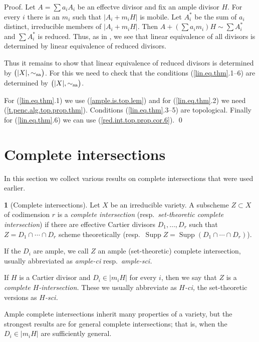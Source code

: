 \documentclass{amsart}
\theoremstyle{definition}
\newtheorem{say}[thm]{}
\theoremstyle{remark}
\newcommand{\supp}[0]{\operatorname{Supp}}
\newcommand{\tsum}[0]{\textstyle{\sum}}
\newcommand{\simsa}[0]{\sim_{\rm sa}}
\begin{document}
Proof. Let $A=\sum a_iA_i$ be an effectve divisor and fix an ample divisor $H$.
For every $i$ there is an $m_i$ such that $|A_i+m_iH|$ is mobile.
Let $A_i^*$ be the sum of $a_i$ distinct, irreducible members of $|A_i+m_iH|$.
Then
$A+(\tsum a_im_i)H\sim \tsum A^*_i$ and $\tsum A^*_i$ is reduced. Thus,
as in \cite[5.3.8]{k-lo-2}, we see that linear equivalence of all  divisors is determined by  linear equivalence of reduced divisors.  

Thus it remains to show that linear equivalence of reduced divisors is determined by  $\bigl(|X|, \simsa\bigr)$. 
For this we need to check that the conditions
(\ref{lin.eq.thm}.1--6) are determined by $\bigl(|X|, \simsa\bigr)$. 

For (\ref{lin.eq.thm}.1) we use (\ref{ample.is.top.lem}) and  for 
(\ref{lin.eq.thm}.2) we need (\ref{t.penc.alg.top.prop.thm}). 
Conditions (\ref{lin.eq.thm}.3--5) are topological.
 Finally for (\ref{lin.eq.thm}.6) we can use 
(\ref{red.int.top.prop.cor.6}). \qed











\section{Complete intersections}\label{compl.int.sec}



In this section we collect various results on complete intersections that were used earlier.

\begin{say}[Complete intersections]\label{ci.sci.say}
 Let $X$ be an irreducible variety.
A subscheme  $Z\subset X$ of codimension $r$ is a {\it complete intersection}
(resp.\ {\it set-theoretic complete intersection}) if there are effective Cartier divisors $D_1,\dots, D_r$ such that
$Z=D_1\cap\cdots\cap D_r$  scheme theoretically  (resp.\ 
$\supp Z=\supp(D_1\cap\cdots\cap D_r)$).

If the $D_i$ are ample, we call $Z$ an  ample (set-theoretic)  complete intersection, usually abbreviated as   {\it ample-ci} resp.\ {\it ample-sci.}

If $H$ is a Cartier divisor and  $D_i\in |m_iH|$   for every $i$, then we say that  $Z$ is a {\it complete $H$-intersection.}
These we usually abbreviate as  {\it $H$-ci, } the set-theoretic versions as {\it $H$-sci.}

Ample complete intersections inherit many properties of a variety, but
the strongest results are for general complete intersections; that is, when the
$D_i\in |m_iH|$ are sufficiently general.
\end{say}
\end{document}
